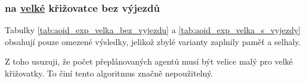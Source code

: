 

\subsubsection{ na \hyperref[par:data_velka]{velké} křižovatce bez výjezdů}
\label{subsubsec:exp_aoid_velka_krizovatka_bez_vyjezdu}

Tabulky \ref{tab:aoid_exp_velka_bez_vyjezdu} a \ref{tab:aoid_exp_velka_s_vyjezdy} obsahují pouze omezené výsledky,
jelikož zbylé varianty zaplnily paměť a selhaly.

Z toho usuzuji, že počet přeplánovaných agentů musí být velice malý pro velké křižovatky.
To činí tento algoritmus značně nepoužitelný.



